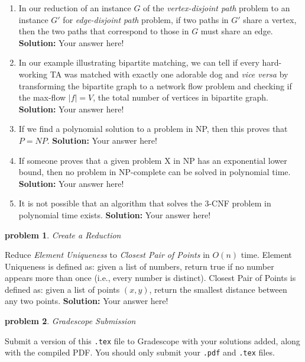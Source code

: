 \documentclass[10pt]{article}
\newcommand{\solution}[1]{\color{blue}\hfill\break\noindent\textbf{Solution:} #1\color{black}}
\newtheorem{problem}{\sc\color{cit}problem}
\begin{document}
\begin{enumerate}
\renewcommand{\theenumi}{\Alph{enumi}}

\item In our reduction of an instance $G$ of the \emph{vertex-disjoint path} problem to an instance $G'$ for \emph{edge-disjoint path} problem, if two paths in $G'$ share a vertex, then the two paths that correspond to those in $G$ must share an edge.
\solution{
Your answer here!
}

\item In our example illustrating bipartite matching, we can tell if every hard-working TA was matched with exactly one adorable dog and \textit{vice versa} by transforming the bipartite graph to a network flow problem and checking if the max-flow $|f| = V$, the total number of vertices in bipartite graph.
\solution{
Your answer here!
}

\item If we find a polynomial solution to a problem in NP, then this proves that $P=NP$.
\solution{
Your answer here!
}

\item If someone proves that a given problem X in NP has an exponential lower bound, then no problem in NP-complete can be solved in polynomial time. 
\solution{
Your answer here!
}

\item It is not possible that an algorithm that solves the 3-CNF problem in polynomial time exists.
\solution{
Your answer here!
}

\end{enumerate}


\begin{problem}Create a Reduction\end{problem}
Reduce \textit{Element Uniqueness} to \textit{Closest Pair of Points} in $O(n)$ time.  Element Uniqueness is defined as: given a list of numbers, return true if no number appears more than once (i.e., every number is distinct).  Closest Pair of Points is defined as: given a list of points $(x,y)$, return the smallest distance between any two points.
\solution{
Your answer here!
}

\begin{problem} Gradescope Submission \end{problem}
Submit a version of this \verb|.tex| file to Gradescope with your solutions added, along with the compiled PDF.  You should only submit your \verb|.pdf| and \verb|.tex| files.
\end{document}
